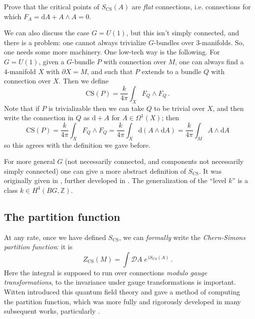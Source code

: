 \documentclass[12pt,letterpaper,reqno]{amsart}
\numberwithin{equation}{section}
\newcommand{\bbZ}{\ensuremath{\mathbb Z}}
\newcommand{\I}{{\mathrm i}}
\newcommand{\de}{\mathrm{d}}
\newcommand{\CS}{\textrm{CS}}
\newcommand{\ti}[1]{\textit{#1}}
\begin{document}
\begin{exercise}
Prove that the critical points of $S_\CS(A)$ are \ti{flat} 
connections, i.e. connections for which $F_A = \de A + A \wedge A = 0$.
\end{exercise}

We can also discuss the case $G = U(1)$, but this isn't simply connected,
and there is a problem: one cannot always trivialize $G$-bundles over 3-manifolds.
So, one needs some more machinery.
One low-tech way is the following. For $G = U(1)$, given a $G$-bundle $P$ with connection over $M$,
one can always find a 4-manifold $X$ with $\partial X = M$, and such that $P$ extends to a bundle $Q$ with connection over $X$.
Then we define
\begin{equation}
  \CS(P) = \frac{k}{4 \pi} \int_X F_Q \wedge F_Q \, . 
\end{equation}
Note that if $P$ is trivializable then we can take $Q$ to be trivial over $X$, and then
write the connection in $Q$ as $\de + A$ for $A \in \Omega^1(X)$;
then 
\begin{equation}
  \CS(P) = \frac{k}{4 \pi} \int_X F_Q \wedge F_Q = \frac{k}{4 \pi} \int_X \de(A \wedge \de A) = \frac{k}{4 \pi} \int_M A \wedge \de A
\end{equation}
so this agrees with the definition we gave before.

For more general $G$ (not necessarily connected, and components not necessarily simply connected) 
one can give a more abstract definition of $S_\CS$. It was originally given in
\cite{DijkgraafWitten1990}, further developed in \cite{Freed1995}. The generalization of the ``level $k$''
is a class $k \in H^4(BG, \bbZ)$.


\subsection{The partition function}

At any rate, once we have defined $S_\CS$, we can \ti{formally} write the \ti{Chern-Simons partition function}: it is
\[
Z_{\mathrm{CS}}(M)
=
\int \mathcal D A \; e^{\, \I S_{\mathrm{CS}}(A)} \, .
\]
Here the integral is supposed to run over connections \ti{modulo gauge transformations},
to the invariance under gauge transformations is important.
Witten \cite{Witten1989Jones} introduced this quantum field theory and
gave a method of computing the partition function, which was more fully and rigorously 
developed in many subsequent works, particularly \cite{ReshetikhinTuraev1991}.
\end{document}
